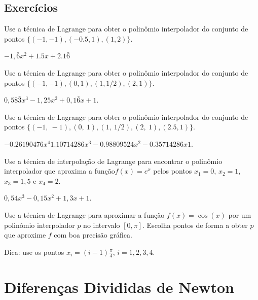 \subsection*{Exercícios}

\begin{exer}
  Use a técnica de Lagrange para obter o polinômio interpolador do conjunto de pontos $\{(-1, -1), (-0.5, 1), (1, 2)\}$.
\end{exer}
\begin{resp}
  $-1,\bar{6}x^2 + 1.5x + 2.1\bar{6}$
\end{resp}

\begin{exer}
  Use a técnica de Lagrange para obter o polinômio interpolador do conjunto de pontos $\{(-1, -1), (0, 1), (1, 1/2), (2, 1)\}$.
\end{exer}
\begin{resp}
  $0,58\bar{3}x^3 - 1,25x^2 + 0,1\bar{6}x + 1$. 
\end{resp}

\begin{exer}
  Use a técnica de Lagrange para obter o polinômio interpolador do conjunto de pontos $\{(-1,~-1), (0,~1), (1,~1/2), (2,~1), (2.5, 1)\}$.
\end{exer}
\begin{resp}
  $-0.26190476x^4  1.10714286x^3 -0.98809524x^2 -0.35714286x  1$.  
\end{resp}

\begin{exer}
  Use a técnica de interpolação de Lagrange para encontrar o polinômio interpolador que aproxima a função$f(x)=e^{x}$ pelos pontos $x_1=0$, $x_2=1$, $x_3=1,5$ e $x_4=2$.
\end{exer}
\begin{resp}
$0,54x^3 - 0,15x^2 + 1,3x + 1$.
\end{resp}

\begin{exer}
  Use a técnica de Lagrange para aproximar a função $f(x) = \cos(x)$ por um polinômio interpolador $p$ no intervalo $[0, \pi]$. Escolha pontos de forma a obter $p$ que aproxime $f$ com boa precisão gráfica.
\end{exer}
\begin{resp}
  Dica: use os pontos $x_i = (i-1)\frac{\pi}{4}$, $i=1,2,3,4$.
\end{resp}

\section{Diferenças Divididas de Newton}\label{cap_interp_sec_difdiv}

